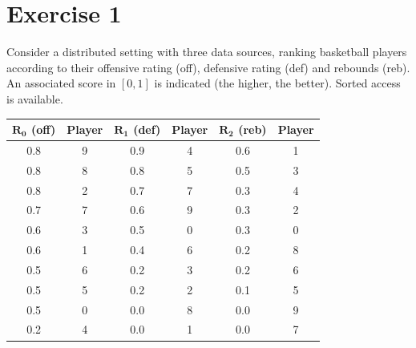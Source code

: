 \section{Exercise 1}

Consider a distributed setting with three data sources, ranking basketball players according to their offensive rating (off), defensive rating (def) and rebounds (reb).
An associated score in $[0,1]$ is indicated (the higher, the better). 
Sorted access is available.
\begin{table}[H]
    \centering
    \begin{tabular}{|cc|cc|cc|}
    \hline
    $\boldsymbol{R_0}$ \textbf{(off)} & \textbf{Player} & $\boldsymbol{R_1}$ \textbf{(def)} & \textbf{Player} & $\boldsymbol{R_2}$ \textbf{(reb)} & \textbf{Player} \\ \hline
    0.8         & 9      & 0.9         & 4      & 0.6         & 1      \\
    0.8         & 8      & 0.8         & 5      & 0.5         & 3      \\
    0.8         & 2      & 0.7         & 7      & 0.3         & 4      \\
    0.7         & 7      & 0.6         & 9      & 0.3         & 2      \\
    0.6         & 3      & 0.5         & 0      & 0.3         & 0      \\
    0.6         & 1      & 0.4         & 6      & 0.2         & 8      \\
    0.5         & 6      & 0.2         & 3      & 0.2         & 6      \\
    0.5         & 5      & 0.2         & 2      & 0.1         & 5      \\
    0.5         & 0      & 0.0         & 8      & 0.0         & 9      \\
    0.2         & 4      & 0.0         & 1      & 0.0         & 7      \\ \hline
    \end{tabular}
\end{table}
